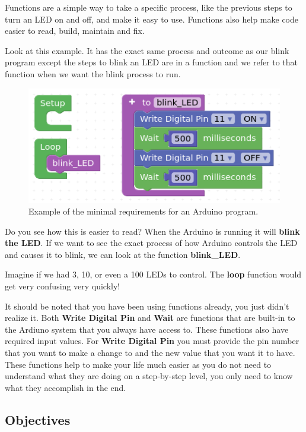 \documentclass[12pt]{article}
\begin{document}
	Functions are a simple way to take a specific process, like the previous steps to turn an LED on and off, and make it easy to use. Functions also help make code easier to read, build, maintain and fix.
	
	Look at this example. It has the exact same process and outcome as our blink program except the steps to blink an LED are in a function and we refer to that function when we want the blink process to run.
	
	\begin{figure}[H]
		\begin{center}
			\includegraphics[scale=0.7]{p_blink_function}
			\caption{Example of the minimal requirements for an Arduino program.}
			\label{prog:blink_function}
		\end{center}
	\end{figure}

	Do you see how this is easier to read? When the Arduino is running it will \textbf{blink the LED}. If we want to see the exact process of how Arduino controls the LED and causes it to blink, we can look at the function \textbf{blink\_LED}.
	
	Imagine if we had 3, 10, or even a 100 LEDs to control. The \textbf{loop} function would get very confusing very quickly!
	
	It should be noted that you have been using functions already, you just didn't realize it. Both \textbf{Write Digital Pin} and \textbf{Wait} are functions that are built-in to the Ardiuno system that you always have access to. These functions also have required input values. For \textbf{Write Digital Pin} you must provide the pin number that you want to make a change to and the new value that you want it to have. These functions help to make your life much easier as you do not need to understand what they are doing on a step-by-step level, you only need to know what they accomplish in the end.
	
	
	
	\subsection{Objectives}
	
\end{document}
